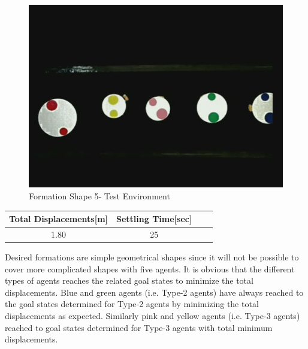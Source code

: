 \begin{figure}[H]
\caption{Formation Shape 5- Test Environment}
\centerline{\includegraphics[scale = 0.35]{9_real_hardware}}
\end{figure} 
					
\begin{center}
 \label{hardwareshape5_ref} 
\begin{tabular}{||c| c |c |c ||}
\hline
\textbf{Total Displacements[m]}  & \textbf{Settling Time[sec]}\\ 
\hline
1.80 & 25 \\
\hline
\end{tabular}
\end{center}

Desired formations are simple geometrical shapes since it will not be possible to cover more complicated shapes with five agents. It is obvious that the different types of agents reaches the related goal states to minimize the total displacements. Blue and green agents (i.e. Type-2 agents) have always reached to the goal states determined for Type-2 agents by minimizing the total displacements as expected. Similarly pink and yellow agents (i.e. Type-3 agents) reached to goal states determined for Type-3 agents with total minimum displacements. 